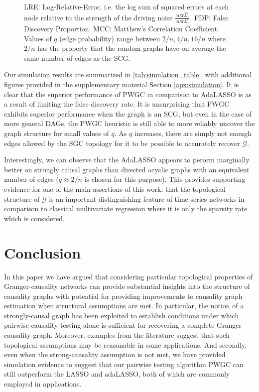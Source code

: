 \documentclass{statsoc}
\def\gcg{\mathcal{G}}  %
\def\ln{\mathsf{ln\ }}  %
\def\tr{\mathsf{tr }}  %
\begin{document}
\begin{figure}[!h]
{    LRE: Log-Relative-Error, i.e. the log sum of squared errors at
    each node relative to the strength of the driving noise
    $\frac{\ln \tr \widehat{\Sigma}_v}{\ln \tr \Sigma_v}$.  FDP: False
    Discovery Proportion.  MCC: Matthew's Correlation Coefficient.\\

    Values of $q$ (edge probability) range between
    $2 / n, 4 / n, 16 / n$ where $2 / n$ has the property that the
    random graphs have on average the same number of edges as the
    SCG.}
\end{figure}

Our simulation results are summarized in \ref{tab:simulation_table},
with additional figures provided in the supplementary material Section
\ref{apx:simulation}.  It is clear that the superior performance of
PWGC in comparison to AdaLASSO is as a result of limiting the false
discovery rate.  It is unsurprising that PWGC exhibits superior
performance when the graph is an SCG, but even in the case of more
general DAGs, the PWGC heuristic is still able to more reliably
uncover the graph structure for small values of $q$.  As $q$
increases, there are simply not enough edges allowed by the SGC
topology for it to be possible to accurately recover $\gcg$.

Interestingly, we can observe that the AdaLASSO appears to perorm
marginally better on strongly causal graphs than directed acyclic
graphs with an equivalent number of edges ($q \approx 2 / n$ is chosen for
this purpose).  This provides supporting evidence for one of the main
assertions of this work: that the topological structure of $\gcg$ is
an important distinguishing feature of time series networks in
comparison to classical multivariate regression where it is only the
sparsity rate which is considered.

\section{Conclusion}
\label{sec:conclusion}
In this paper we have argued that considering particular topological
properties of Granger-causality networks can provide substantial
insights into the structure of causality graphs with potential for
providing improvements to causality graph estimation when structural
assumptions are met.  In particular, the notion of a strongly-causal
graph has been exploited to establish conditions under which pairwise
causality testing alone is sufficient for recovering a complete
Granger-causality graph.  Moreover, examples from the literature
suggest that such topological assumptions may be reasonable in some
applications.  And secondly, even when the strong-causality assumption
is not met, we have provided simulation evidence to suggest that our
pairwise testing algorithm PWGC can still outperform the LASSO and
adaLASSO, both of which are commonly employed in applications.
\end{document}
